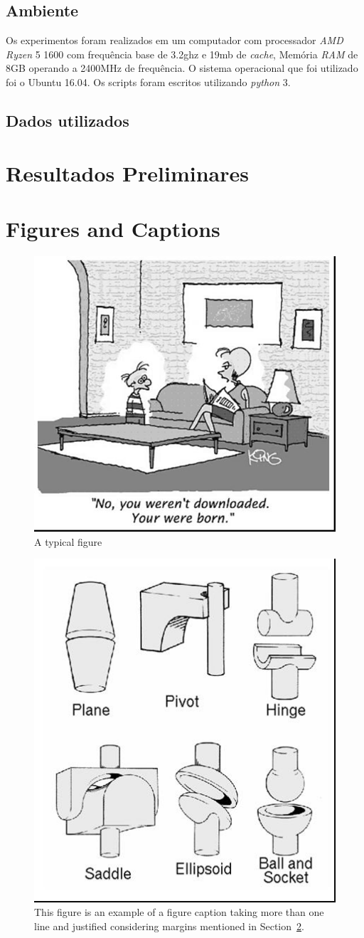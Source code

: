 \documentclass[12pt]{article}
\begin{document}
\subsection{Ambiente}
Os experimentos foram realizados em um computador com processador \textit{AMD Ryzen} 5 1600 com frequência base de 3.2ghz e 19mb de \textit{cache}, Memória \textit{RAM} de 8GB operando a 2400MHz de frequência. O sistema operacional que foi utilizado foi o Ubuntu 16.04. Os scripts foram escritos utilizando \textit{python} 3.
\subsection{Dados utilizados}



\section{Resultados Preliminares}


\section{Figures and Captions}\label{sec:figs}


\begin{figure}[ht]
\centering
\includegraphics[width=.5\textwidth]{fig1.jpg}
\caption{A typical figure}
\label{fig:exampleFig1}
\end{figure}

\begin{figure}[ht]
\centering
\includegraphics[width=.3\textwidth]{fig2.jpg}
\caption{This figure is an example of a figure caption taking more than one
  line and justified considering margins mentioned in Section~\ref{sec:figs}.}
\label{fig:exampleFig2}
\end{figure}
\end{document}
